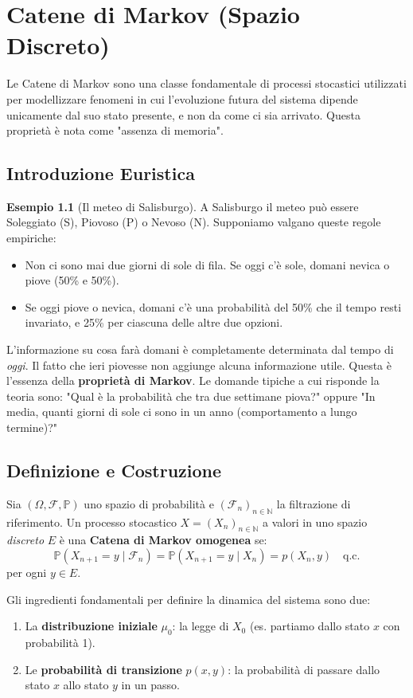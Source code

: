 \documentclass[11pt, a4paper]{report}
\theoremstyle{plain}
\theoremstyle{definition}
\newtheorem{esempio}[theorem]{Esempio}
\theoremstyle{remark}
\newcommand{\PP}{\mathbb{P}}
\newcommand{\F}{\mathcal{F}}
\newcommand{\N}{\mathbb{N}}
\newcommand{\1}{\mathbf{1}}
\begin{document}
\chapter{Catene di Markov (Spazio Discreto)}

Le Catene di Markov sono una classe fondamentale di processi stocastici utilizzati per modellizzare fenomeni in cui l'evoluzione futura del sistema dipende unicamente dal suo stato presente, e non da come ci sia arrivato. Questa proprietà è nota come "assenza di memoria".

\section{Introduzione Euristica}

\begin{esempio}[Il meteo di Salisburgo]
A Salisburgo il meteo può essere Soleggiato (S), Piovoso (P) o Nevoso (N). Supponiamo valgano queste regole empiriche:
\begin{itemize}
    \item Non ci sono mai due giorni di sole di fila. Se oggi c'è sole, domani nevica o piove (50\% e 50\%).
    \item Se oggi piove o nevica, domani c'è una probabilità del 50\% che il tempo resti invariato, e 25\% per ciascuna delle altre due opzioni.
\end{itemize}
L'informazione su cosa farà domani è completamente determinata dal tempo di \emph{oggi}. Il fatto che ieri piovesse non aggiunge alcuna informazione utile. Questa è l'essenza della \textbf{proprietà di Markov}.
Le domande tipiche a cui risponde la teoria sono: "Qual è la probabilità che tra due settimane piova?" oppure "In media, quanti giorni di sole ci sono in un anno (comportamento a lungo termine)?"
\end{esempio}

\section{Definizione e Costruzione}

Sia $(\Omega, \F, \PP)$ uno spazio di probabilità e $(\F_n)_{n \in \N}$ la filtrazione di riferimento. Un processo stocastico $X = (X_n)_{n \in \N}$ a valori in uno spazio \emph{discreto} $E$ è una \textbf{Catena di Markov omogenea} se:
\[ \PP(X_{n+1} = y \mid \F_n) = \PP(X_{n+1} = y \mid X_n) = p(X_n, y) \quad \text{q.c.} \]
per ogni $y \in E$.

Gli ingredienti fondamentali per definire la dinamica del sistema sono due:
\begin{enumerate}
    \item La \textbf{distribuzione iniziale} $\mu_0$: la legge di $X_0$ (es. partiamo dallo stato $x$ con probabilità 1).
    \item Le \textbf{probabilità di transizione} $p(x, y)$: la probabilità di passare dallo stato $x$ allo stato $y$ in un passo. 
\end{enumerate}
\end{document}
